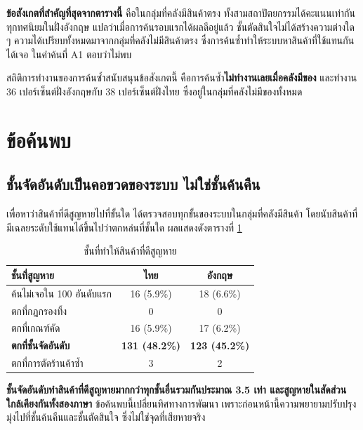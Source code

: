\textbf{ข้อสังเกตที่สำคัญที่สุดจากตารางนี้} คือในกลุ่มที่คลังมีสินค้าตรง ทั้งสามสถาปัตยกรรมได้คะแนนเท่ากันทุกทศนิยมในฝั่งอังกฤษ แปลว่าเมื่อการค้นรอบแรกได้ผลดีอยู่แล้ว ชั้นตัดสินใจไม่ได้สร้างความต่างใด ๆ ความได้เปรียบทั้งหมดมาจากกลุ่มที่คลังไม่มีสินค้าตรง ซึ่งการค้นซ้ำทำให้ระบบหาสินค้าที่ใช้แทนกันได้เจอ ในคำค้นที่ A1 ตอบว่าไม่พบ

สถิติการทำงานของการค้นซ้ำสนับสนุนข้อสังเกตนี้ คือการค้นซ้ำ\textbf{ไม่ทำงานเลยเมื่อคลังมีของ} และทำงาน 36 เปอร์เซ็นต์ฝั่งอังกฤษกับ 38 เปอร์เซ็นต์ฝั่งไทย ซึ่งอยู่ในกลุ่มที่คลังไม่มีของทั้งหมด

\section{ข้อค้นพบ}

\subsection{ชั้นจัดอันดับเป็นคอขวดของระบบ ไม่ใช่ชั้นค้นคืน}

เพื่อหาว่าสินค้าที่ดีสูญหายไปที่ขั้นใด ได้ตรวจสอบทุกขั้นของระบบในกลุ่มที่คลังมีสินค้า โดยนับสินค้าที่มีเฉลยระดับใช้แทนได้ขึ้นไปว่าตกหล่นที่ชั้นใด ผลแสดงดังตารางที่ \ref{tab:funnel}

\begin{table}[H]
\centering
\caption{ชั้นที่ทำให้สินค้าที่ดีสูญหาย}
\label{tab:funnel}
\begin{tabular}{|l|c|c|}
\hline
\textbf{ชั้นที่สูญหาย} & \textbf{ไทย} & \textbf{อังกฤษ} \\
\hline
ค้นไม่เจอใน 100 อันดับแรก & 16 (5.9\%) & 18 (6.6\%) \\ \hline
ตกที่กฎกรองทิ้ง & 0 & 0 \\ \hline
ตกที่เกณฑ์คัด & 16 (5.9\%) & 17 (6.2\%) \\ \hline
\textbf{ตกที่ชั้นจัดอันดับ} & \textbf{131 (48.2\%)} & \textbf{123 (45.2\%)} \\ \hline
ตกที่การตัดร้านค้าซ้ำ & 3 & 2 \\
\hline
\end{tabular}
\end{table}

\textbf{ชั้นจัดอันดับทำสินค้าที่ดีสูญหายมากกว่าทุกชั้นอื่นรวมกันประมาณ 3.5 เท่า และสูญหายในสัดส่วนใกล้เคียงกันทั้งสองภาษา} ข้อค้นพบนี้เปลี่ยนทิศทางการพัฒนา เพราะก่อนหน้านี้ความพยายามปรับปรุงมุ่งไปที่ชั้นค้นคืนและชั้นตัดสินใจ ซึ่งไม่ใช่จุดที่เสียหายจริง

